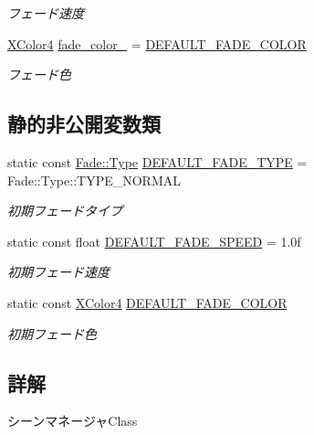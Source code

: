 \begin{DoxyCompactItemize}
\begin{DoxyCompactList}\small\item\em フェード速度 \end{DoxyCompactList}\item 
\mbox{\hyperlink{_vector3_d_8h_a680c30c4a07d86fe763c7e01169cd6cc}{X\+Color4}} \mbox{\hyperlink{class_scene_manager_a978b815258c4591f81a16995484fe9fb}{fade\+\_\+color\+\_\+}} = \mbox{\hyperlink{class_scene_manager_a8b6874644ba8998b0db76780d56f371f}{D\+E\+F\+A\+U\+L\+T\+\_\+\+F\+A\+D\+E\+\_\+\+C\+O\+L\+OR}}
\begin{DoxyCompactList}\small\item\em フェード色 \end{DoxyCompactList}\end{DoxyCompactItemize}
\subsection*{静的非公開変数類}
\begin{DoxyCompactItemize}
\item 
static const \mbox{\hyperlink{class_fade_ac06f27215b454aa05b93c236476d6e80}{Fade\+::\+Type}} \mbox{\hyperlink{class_scene_manager_ab87f30ef7e11305bb4e3400b41225c22}{D\+E\+F\+A\+U\+L\+T\+\_\+\+F\+A\+D\+E\+\_\+\+T\+Y\+PE}} = Fade\+::\+Type\+::\+T\+Y\+P\+E\+\_\+\+N\+O\+R\+M\+AL
\begin{DoxyCompactList}\small\item\em 初期フェードタイプ \end{DoxyCompactList}\item 
static const float \mbox{\hyperlink{class_scene_manager_a58cd446096f95d3e62e7eba16a4096ee}{D\+E\+F\+A\+U\+L\+T\+\_\+\+F\+A\+D\+E\+\_\+\+S\+P\+E\+ED}} = 1.\+0f
\begin{DoxyCompactList}\small\item\em 初期フェード速度 \end{DoxyCompactList}\item 
static const \mbox{\hyperlink{_vector3_d_8h_a680c30c4a07d86fe763c7e01169cd6cc}{X\+Color4}} \mbox{\hyperlink{class_scene_manager_a8b6874644ba8998b0db76780d56f371f}{D\+E\+F\+A\+U\+L\+T\+\_\+\+F\+A\+D\+E\+\_\+\+C\+O\+L\+OR}}
\begin{DoxyCompactList}\small\item\em 初期フェード色 \end{DoxyCompactList}\end{DoxyCompactItemize}


\subsection{詳解}
シーンマネージャ\+Class 

